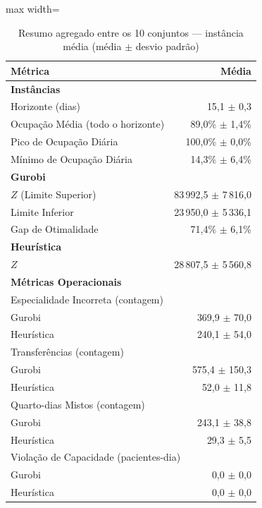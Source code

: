 \begin{table}[htbp]
    \caption{Resumo agregado entre os 10 conjuntos --- instância média (média $\pm$ desvio padrão)}
    \label{tab:agregado-medio}
    \centering
    \begin{adjustbox}{max width=\textwidth}
    \begin{tabular}{lr}
        \hline
        \textbf{Métrica} & \textbf{Média} \\
        \hline
        \multicolumn{2}{l}{\textbf{Instâncias}} \\
        Horizonte (dias) & 15,1 $\pm$ 0,3 \\
        Ocupação Média (todo o horizonte) & 89,0\% $\pm$ 1,4\% \\
        Pico de Ocupação Diária & 100,0\% $\pm$ 0,0\% \\
        Mínimo de Ocupação Diária & 14,3\% $\pm$ 6,4\% \\
        \hline
        \multicolumn{2}{l}{\textbf{Gurobi}} \\
        $Z$ (Limite Superior) & 83\,992,5 $\pm$ 7\,816,0 \\
        Limite Inferior & 23\,950,0 $\pm$ 5\,336,1 \\
        Gap de Otimalidade & 71,4\% $\pm$ 6,1\% \\
        \hline
        \multicolumn{2}{l}{\textbf{Heurística}} \\
        $Z$ & 28\,807,5 $\pm$ 5\,560,8 \\
        \hline
        \multicolumn{2}{l}{\textbf{Métricas Operacionais}} \\
        \multicolumn{2}{l}{Especialidade Incorreta (contagem)} \\
        \quad Gurobi & 369,9 $\pm$ 70,0 \\
        \quad Heurística & 240,1 $\pm$ 54,0 \\
        \multicolumn{2}{l}{Transferências (contagem)} \\
        \quad Gurobi & 575,4 $\pm$ 150,3 \\
        \quad Heurística & 52,0 $\pm$ 11,8 \\
        \multicolumn{2}{l}{Quarto-dias Mistos (contagem)} \\
        \quad Gurobi & 243,1 $\pm$ 38,8 \\
        \quad Heurística & 29,3 $\pm$ 5,5 \\
        \multicolumn{2}{l}{Violação de Capacidade (pacientes-dia)} \\
        \quad Gurobi & 0,0 $\pm$ 0,0 \\
        \quad Heurística & 0,0 $\pm$ 0,0 \\
        \hline
    \end{tabular}
    \end{adjustbox}
\end{table}
